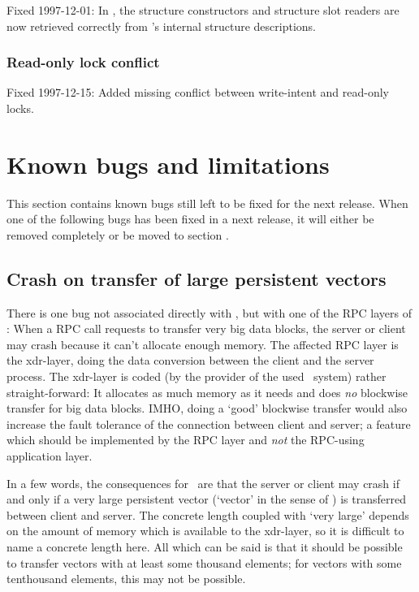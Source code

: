 Fixed 1997-12-01: In \allegrocl, the structure constructors and
structure slot readers are now retrieved correctly from \allegro's
internal structure descriptions.

\subsubsection{Read-only lock conflict}

Fixed 1997-12-15: Added missing conflict between write-intent and
read-only locks.

\section{Known bugs and limitations}

This section contains known bugs still left to be fixed for the next
release. When one of the following bugs has been fixed in a next
release, it will either be removed completely or be moved to section
.

\subsection{Crash on transfer of large persistent vectors}

There is one bug not associated directly with \plobwoexcl, but with
one of the RPC layers of \unix: When a RPC call requests to transfer
very big data blocks, the server or client may crash because it can't
allocate enough memory. The affected RPC layer is the xdr-layer, doing
the data conversion between the client and the server process. The
xdr-layer is coded (by the provider of the used \unix\ system) rather
straight-forward: It allocates as much memory as it needs and does
\emph{no} blockwise transfer for big data blocks. IMHO, doing a `good'
blockwise transfer would also increase the fault tolerance of the
connection between client and server; a feature which should be
implemented by the RPC layer and \emph{not} the RPC-using application
layer.

In a few words, the consequences for \plob\ are that the server or
client may crash if and only if a very large persistent vector
(`vector' in the sense of \cl) is transferred between client and
server. The concrete length coupled with `very large' depends on the
amount of memory which is available to the xdr-layer, so it is
difficult to name a concrete length here. All which can be said is
that it should be possible to transfer vectors with at least some
thousand elements; for vectors with some tenthousand elements, this
may not be possible.

